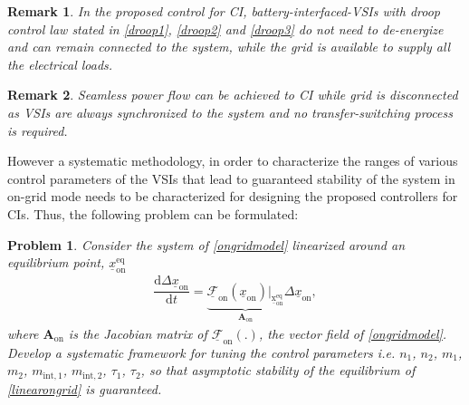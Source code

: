 \documentclass[journal]{IEEEtran}
\newtheorem{remark}{Remark}
\newtheorem{problem}{Problem}
\begin{document}
\begin{remark}\label{remark2}
In the proposed control for CI, battery-interfaced-VSIs with droop control law stated in \eqref{droop1}, \eqref{droop2} and \eqref{droop3} do not need to de-energize and can remain connected to the system, while the grid is available to supply all the electrical loads.
\end{remark}
\begin{remark}\label{remark3}
Seamless power flow can be achieved to CI while grid is disconnected as VSIs are always synchronized to the system and no transfer-switching process is required.
\end{remark}
However a systematic methodology, in order to characterize the ranges of various control parameters of the VSIs that lead to guaranteed stability of the system in on-grid mode needs to be characterized for designing the proposed controllers for CIs. Thus, the following problem can be formulated:
\begin{problem}\label{problem1}
Consider the system of \eqref{ongridmodel} linearized around
an equilibrium point, $\underline{x}_\mathrm{on}^\mathrm{eq}$
\begin{align}\label{linearongrid}
    \dfrac{\mathrm{d}\Delta \underline{x}_\mathrm{on}}{\mathrm{d}t}=\underbrace{\mathcal{\underline{F}}_\mathrm{on}(\underline{x}_\mathrm{on})\big|_\mathrm{\underline{x}_\mathrm{on}^\mathrm{eq}}}_{\mathbf{A}_\mathrm{on}}\Delta \underline{x}_\mathrm{on},
\end{align}
where $\mathbf{A_{\mathrm{on}}}$ is the Jacobian matrix of $\mathcal{\underline{F}}_\mathrm{on}(.)$, the vector field of \eqref{ongridmodel}. Develop a systematic framework for tuning the control parameters i.e. $n_\mathrm{1}$, $n_\mathrm{2}$, $m_\mathrm{1}$, $m_\mathrm{2}$, $m_\mathrm{int,1}$, $m_\mathrm{int,2}$, $\tau_\mathrm{1}$, $\tau_\mathrm{2}$, so that asymptotic stability of the equilibrium of \eqref{linearongrid} is guaranteed.
\end{problem}
\end{document}
